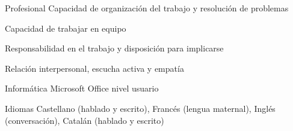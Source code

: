 

\begin{cvskills}

  \cvskill
    {Profesional} %
    {Capacidad de organización del trabajo y resolución de problemas} %

  \cvskill
    {} %
    {Capacidad de trabajar en equipo} %

  \cvskill
    {} %
    {Responsabilidad en el trabajo y disposición para implicarse} %

  \cvskill
    {} %
    {Relación interpersonal, escucha activa y empatía} %

  \cvskill
    {Informática} %
    {Microsoft Office nivel usuario} %

  \cvskill
    {Idiomas} %
    {Castellano (hablado y escrito), Francés (lengua maternal), Inglés (conversación), Catalán (hablado y escrito)} %

\end{cvskills}
